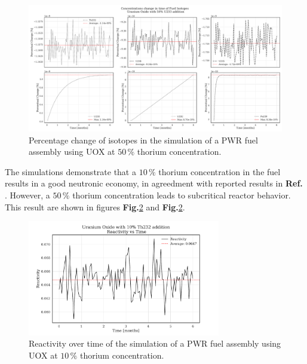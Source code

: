 \begin{figure}[ht]
    \centering
    \includegraphics[width=1\textwidth]{Kap7/Figures_Kap7/percentual_change_th232_con_50.pdf}
    \caption{Percentage change of isotopes in the simulation of a PWR fuel assembly using UOX at \(50 \, \%\) thorium concentration.}
    \label{fig:th50}
\end{figure}

The simulations demonstrate that a \(10 \, \%\) thorium concentration in the fuel results in a good neutronic economy, in agreedment with reported results in \textbf{Ref.} \cite{N_Improvement}. However, a \(50 \, \%\) thorium concentration leads to subcritical reactor behavior. This result are shown in figures \textbf{Fig.}\ref{fig:p_10} and \textbf{Fig.}\ref{fig:p_10}.

\begin{figure}[ht]
    \centering
    \includegraphics[width=0.75\textwidth, scale = 0.5]{Kap7/Figures_Kap7/Reactivity_vs_Time_UOX_10.pdf}
    \caption{Reactivity over time of the simulation of a PWR fuel assembly using UOX at \(10 \, \%\) thorium concentration.}
    \label{fig:p_10}
\end{figure}

